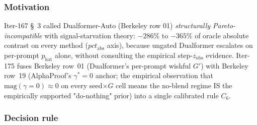 
\subsubsection*{Motivation}

Iter-167 \S~3 called Dualformer-Auto (Berkeley row 01) \emph{structurally
Pareto-incompatible} with signal-starvation theory: $-286\%$ to $-365\%$ of
oracle absolute contrast on every method ($pct_{\mathrm{abs}}$ axis),
because ungated Dualformer escalates on per-prompt $p_{\mathrm{hat}}$ alone,
without consulting the empirical step-$z_{\mathrm{obs}}$ evidence.
Iter-175 fuses Berkeley row~01 (Dualformer's per-prompt wishful $G'$) with
Berkeley row~19 (AlphaProof's $\gamma^*{=}0$ anchor; the empirical
observation that $\mathrm{mag}(\gamma{=}0) \approx 0$ on every seed$\times G$
cell means the no-blend regime IS the empirically supported "do-nothing"
prior) into a single calibrated rule $C_6$.

\subsubsection*{Decision rule}


